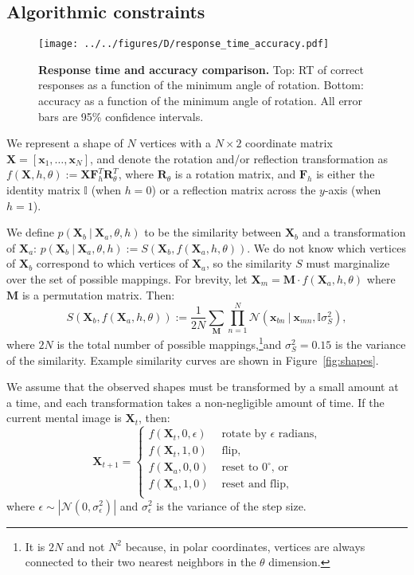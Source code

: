\documentclass[10pt,letterpaper]{article}
\newcommand{\Xa}[0]{\mathbf{X}_a}
\newcommand{\Xb}[0]{\mathbf{X}_b}
\newcommand{\Xt}[0]{\mathbf{X}_t}
\newcommand{\R}[0]{\mathbf{R}_\theta}
\newcommand{\F}[0]{\mathbf{F}}
\newcommand{\M}[0]{\mathbf{M}}
\newcommand{\I}[0]{\mathbb{I}}
\newcommand{\hi}[0]{h=0}
\newcommand{\hf}[0]{h=1}
\begin{document}
\subsection{Algorithmic constraints}

\begin{figure*}[t]
  \begin{center}
    \texttt{[image: ../../figures/D/response\_time\_accuracy.pdf]}
    \caption{\textbf{Response time and accuracy comparison.} Top: RT
      of correct responses as a function of the minimum angle of
      rotation. Bottom: accuracy as a function of the minimum angle of
      rotation. All error bars are 95\% confidence intervals.}
    \label{fig:response-time-accuracy}
  \end{center}
\end{figure*}

We represent a shape of $N$ vertices with a $N\times 2$ coordinate
matrix $\mathbf{X}=[\mathbf{x}_1, \ldots{}, \mathbf{x}_N]$, and denote
the rotation and/or reflection transformation as $f(\mathbf{X}, h,
\theta):=\mathbf{X}\F_h^T\R^T$, where $\R$ is a rotation matrix, and
$\F_h$ is either the identity matrix $\I$ (when $\hi$) or a reflection
matrix across the $y$-axis (when $\hf$).

We define $p(\Xb\ \vert\ \Xa, \theta, h)$ to be the similarity between
$\Xb$ and a transformation of $\Xa$: $p(\Xb\ \vert\ \Xa, \theta, h):=
S(\Xb, f(\Xa, h, \theta))$.  We do not know which vertices of $\Xb$
correspond to which vertices of $\Xa$, so the similarity $S$ must
marginalize over the set of possible mappings. For brevity, let
$\mathbf{X}_m=\M\cdot{}f(\Xa, h, \theta)$ where $\M$ is a permutation
matrix. Then:
\begin{equation}
  S(\Xb, f(\Xa, h, \theta)):=\frac{1}{2N} \sum_{\M} \prod_{n=1}^N \mathcal{N}(\mathbf{x}_{bn}\ \vert \ \mathbf{x}_{mn}, \I\sigma_S^2),
  \label{eq:similarity}
\end{equation}
where $2N$ is the total number of possible mappings,\footnote{It is
  $2N$ and not $N^2$ because, in polar coordinates, vertices are
  always connected to their two nearest neighbors in the $\theta$
  dimension.}and $\sigma_S^2=0.15$ is the variance of the
similarity. Example similarity curves are shown in
Figure~\ref{fig:shapes}.

We assume that the observed shapes must be transformed by a small
amount at a time, and each transformation takes a non-negligible
amount of time. If the current mental image is $\Xt$, then:
\begin{equation}
  \mathbf{X}_{t+1} = \left\{ \begin{array}{ll}
      f(\Xt, 0, \epsilon) &\mbox{ rotate by $\epsilon$ radians,} \\
      f(\Xt, 1, 0) &\mbox{ flip,} \\
      f(\Xa, 0, 0) &\mbox{ reset to $0^\circ$, or} \\
      f(\Xa, 1, 0) &\mbox{ reset and flip,} \\
    \end{array} \right.
  \label{eq:actions}
\end{equation}
where $\epsilon\sim \left|\mathcal{N}(0, \sigma_\epsilon^2)\right|$
and $\sigma_\epsilon^2$ is the variance of the step size.
\end{document}
